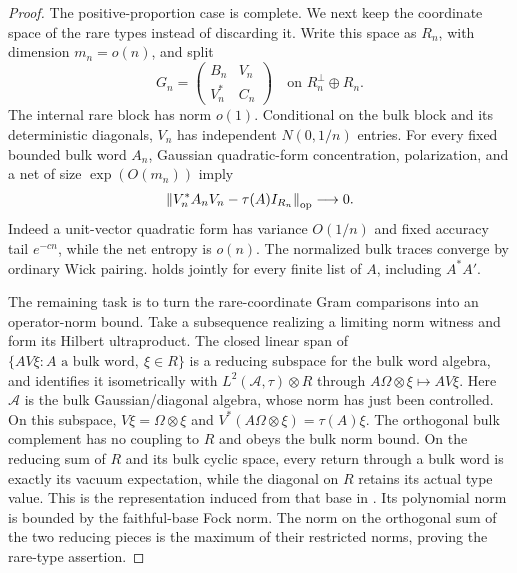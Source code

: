 \begin{proof}
The positive-proportion case is complete.  We next keep the coordinate
space of the rare types instead of discarding it.  Write this space
as $R_n$, with dimension $m_n=o(n)$, and split
\[
 G_n=\begin{pmatrix}B_n&V_n\\V_n^*&C_n\end{pmatrix}
       \quad\text{on }R_n^\perp\oplus R_n.
\]
The internal rare block has norm $o(1)$.  Conditional on the bulk
block and its deterministic diagonals, $V_n$ has independent
$N(0,1/n)$ entries.  For every fixed bounded bulk word $A_n$,
Gaussian quadratic-form concentration, polarization, and a net of
size $\exp(O(m_n))$ imply
\begin{equation}
 \left\lVert V_n^*A_nV_n-\tau(A)I_{R_n}\right\rVert_{\mathrm{op}}\longrightarrow0.
 \label{eq:path-rare-gram}
\end{equation}
Indeed a unit-vector quadratic form has variance $O(1/n)$ and fixed
accuracy tail $e^{-cn}$, while the net entropy is $o(n)$.
The normalized bulk traces converge by ordinary Wick pairing.
 holds jointly for every finite list
of $A$, including $A^*A'$.

The remaining task is to turn the rare-coordinate Gram comparisons
into an operator-norm bound.  Take a subsequence realizing a limiting
norm witness and form its Hilbert ultraproduct.  The closed linear span of
$\{A V\xi:A\text{ a bulk word},\ \xi\in R\}$ is a reducing
subspace for the bulk word algebra, and
 identifies it isometrically with
$L^2(\mathscr A,\tau)\otimes R$ through
$A\Omega\otimes\xi\mapsto AV\xi$.  Here $\mathscr A$ is the bulk
Gaussian/diagonal algebra, whose norm has just been controlled.
On this subspace, $V\xi=\Omega\otimes\xi$ and
$V^*(A\Omega\otimes\xi)=\tau(A)\xi$.
The orthogonal bulk complement has no coupling to $R$ and obeys the
bulk norm bound.  On the reducing sum of $R$ and its bulk cyclic
space, every return through a bulk word is exactly its vacuum
expectation, while the diagonal on $R$ retains its actual type value.
This is the representation induced from that base in
.  Its polynomial norm is bounded by the
faithful-base Fock norm.  The norm on the orthogonal sum of the two
reducing pieces is the maximum of their restricted norms, proving
the rare-type assertion.


\end{proof}
